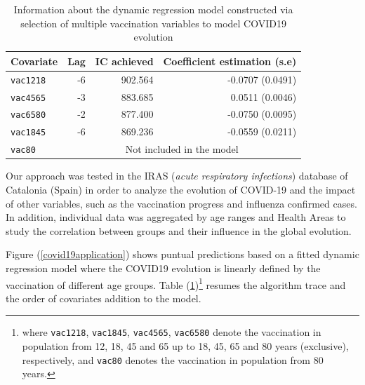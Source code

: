 \documentclass[a4paper]{easychair}
\begin{document}
\begin{table}
    \centering
    \setlength{\tabcolsep}{20pt}
    \label{covid19model}
    \caption{Information about the dynamic regression model constructed via selection of multiple vaccination variables to model COVID19 evolution} 

    \vspace{1em}
    \begin{tabular}{|l|rrr|}
        \hline
        \textbf{Covariate}  & \textbf{Lag}  & \textbf{IC achieved}  & \textbf{Coefficient estimation (s.e)} \\ 
        \hline 
        \texttt{vac1218}    & -6            & 902.564               & -0.0707 (0.0491)                      \\
        \texttt{vac4565}    & -3            & 883.685               & 0.0511 (0.0046)                       \\ 
        \texttt{vac6580}    & -2            & 877.400               & -0.0750 (0.0095)                      \\
        \texttt{vac1845}    & -6            & 869.236               & -0.0559 (0.0211)                      \\
        \hline
        \texttt{vac80}      & \multicolumn{3}{c|}{Not included in the model} \\
        \hline        
    \end{tabular}
\end{table}

Our approach was tested in the IRAS (\textit{acute respiratory infections}) database of Catalonia (Spain) in order to analyze the evolution of COVID-19 and the impact of other variables, such as the vaccination progress and influenza confirmed cases. In addition, individual data was aggregated by age ranges and Health Areas to study the correlation between groups and their influence in the global evolution. 

Figure (\ref{covid19application}) shows puntual predictions based on a fitted dynamic regression model where the COVID19 evolution is linearly defined by the vaccination of different age groups. Table (\ref{covid19model})\footnote{where \texttt{vac1218}, \texttt{vac1845}, \texttt{vac4565}, \texttt{vac6580} denote the vaccination in population from 12, 18, 45 and 65 up to 18, 45, 65 and 80 years (exclusive), respectively, and \texttt{vac80} denotes the vaccination in population from 80 years.} resumes the algorithm trace and the order of covariates addition to the model.



\end{document}
